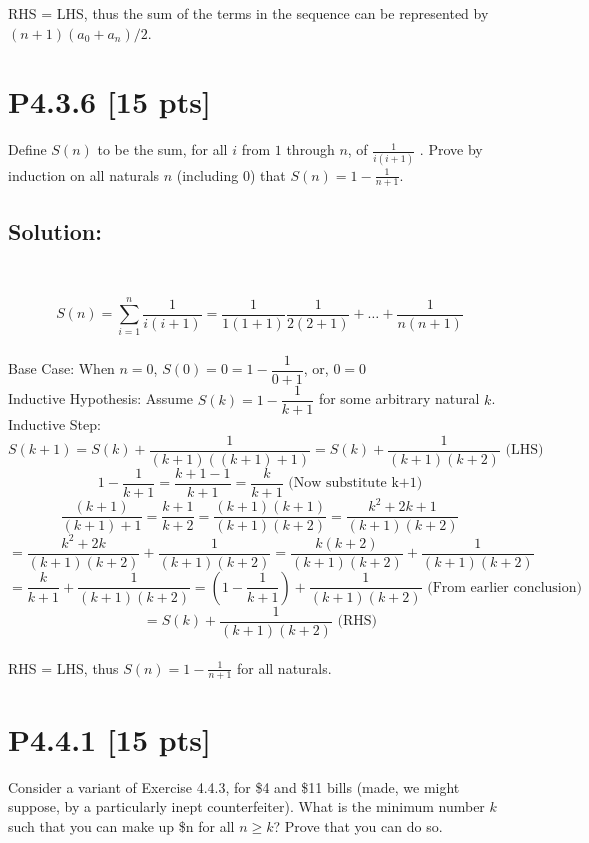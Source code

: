 \documentclass[12pt]{article}
\begin{document}
				RHS = LHS, thus the sum of the terms in the sequence can be represented by ${(n + 1)(a_0 + a_n)/2}$.

\newpage
\section*{\textbf{P4.3.6} [15 pts]}
Define $S(n)$ to be the sum, for all $i$ from $1$ through $n$, of $\frac{1}{i(i+1)}$ . Prove by induction on all naturals $n$ (including $0$) that $S(n) = 1 - \frac{1}{n+1}$.


\subsection*{\textbf{Solution:}}~

\[ S(n) = \sum_{i=1}^{n} \dfrac{1}{i(i+1)} = \dfrac{1}{1(1+1)} \dfrac{1}{2(2+1)} + \ldots +\dfrac{1}{n(n+1)}\] \\

Base Case: When $n=0$, $S(0) = 0 = 1-\dfrac{1}{0+1}$, or, $0 = 0$\\

Inductive Hypothesis: Assume $S(k) = 1-\dfrac{1}{k+1}$ for some arbitrary natural $k$.\\

Inductive Step: \[ S(k+1) = S(k) + \dfrac{1}{(k+1)((k+1)+1)} = S(k) + \dfrac{1}{(k+1)(k+2)} \text{ (LHS)} \]
			    \[ 1-\dfrac{1}{k+1} = \dfrac{k+1-1}{k+1} = \dfrac{k}{k+1} \text{ (Now substitute k+1)} \]
			    \[ \dfrac{(k+1)}{(k+1)+1} = \dfrac{k+1}{k+2} = \dfrac{(k+1)(k+1)}{(k+1)(k+2)} = \dfrac{k^{2}+2k+1}{(k+1)(k+2)} \]
			    \[ = \dfrac{k^{2}+2k}{(k+1)(k+2)} + \dfrac{1}{(k+1)(k+2)} = \dfrac{k(k+2)}{(k+1)(k+2)} + \dfrac{1}{(k+1)(k+2)}\]
			    \[ = \dfrac{k}{k+1} + \dfrac{1}{(k+1)(k+2)} = (1-\dfrac{1}{k+1}) + \dfrac{1}{(k+1)(k+2)} \text{ (From earlier conclusion)} \]
			    \[ = S(k) + \dfrac{1}{(k+1)(k+2)} \text{ (RHS)} \]\\

				RHS = LHS, thus $S(n) = 1 - \frac{1}{n+1}$ for all naturals.



\newpage
\section*{\textbf{P4.4.1} [15 pts]}
Consider a variant of Exercise 4.4.3, for \$4 and \$11 bills (made, we might suppose, by a particularly inept counterfeiter). What is the minimum number $k$ such that you can make up \$n for all $n \geq k$? Prove that you can do so.
\end{document}
